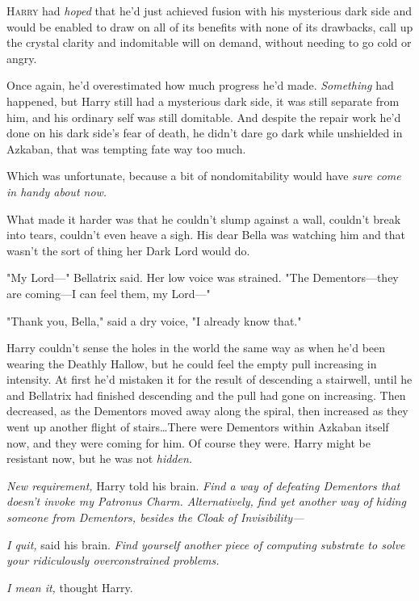 
\lettrine{H}{arry} had
\emph{hoped} that he'd just achieved fusion with his mysterious dark side and
would be enabled to draw on all of its benefits with none of its drawbacks,
call up the crystal clarity and indomitable will on demand, without needing to
go cold or angry.

Once again, he'd overestimated how much progress he'd made. \emph{Something}
had happened, but Harry still had a mysterious dark side, it was still separate
from him, and his ordinary self was still domitable. And despite the repair
work he'd done on his dark side's fear of death, he didn't dare go dark while
unshielded in Azkaban, that was tempting fate way too much.

Which was unfortunate, because a bit of nondomitability would have \emph{sure
come in handy about now.}

What made it harder was that he couldn't slump against a wall, couldn't break
into tears, couldn't even heave a sigh. His dear Bella was watching him and
that wasn't the sort of thing her Dark Lord would do.

"My Lord---" Bellatrix said. Her low voice was strained. "The Dementors---they
are coming---I can feel them, my Lord---"

"Thank you, Bella," said a dry voice, "I already know that."

Harry couldn't sense the holes in the world the same way as when he'd been
wearing the Deathly Hallow, but he could feel the empty pull increasing in
intensity. At first he'd mistaken it for the result of descending a stairwell,
until he and Bellatrix had finished descending and the pull had gone on
increasing. Then decreased, as the Dementors moved away along the spiral, then
increased as they went up another flight of stairs…There were Dementors
within Azkaban itself now, and they were coming for him. Of course they were.
Harry might be resistant now, but he was not \emph{hidden.}

\emph{New requirement,} Harry told his brain. \emph{Find a way of defeating
Dementors that doesn't invoke my Patronus Charm. Alternatively, find yet
another way of hiding someone from Dementors, besides the Cloak of
Invisibility---}

\emph{I quit,} said his brain. \emph{Find yourself another piece of computing
substrate to solve your ridiculously overconstrained problems.}

\emph{I mean it,} thought Harry.

